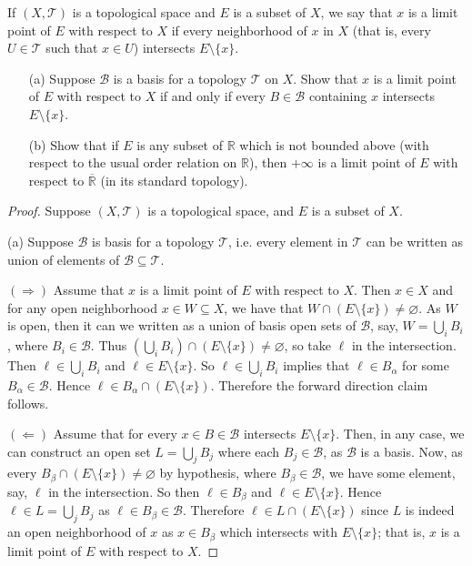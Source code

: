 \documentclass[10pt,reqno]{amsart}
\theoremstyle{definition}
\newcommand{\rr}{\mathbb R}
\begin{document}
\begin{tcolorbox}[colback=black!5!white,colframe=black!75!black,title= Chapter 4: Exercise 1.3.] If $(X, \mathcal T)$ is a topological space and $E$ is a subset of $X$, we say that $x$ is a limit point of $E$ with respect to $X$ if every neighborhood of $x$ in $X$ (that is, every $U \in \mathcal T$ such that $x \in U$) intersects $E \setminus \{ x \}$.
\begin{itemize}
	\item [(a)] Suppose $\mathcal B$ is a basis for a topology $\mathcal T$ on $X$. Show that $x$ is a limit point of $E$ with respect to $X$ if and only if every $B \in \mathcal B$ containing $x$ intersects $E \setminus \{x \}$.
	\item [(b)] Show that if $E$ is any subset of $\rr$ which is not bounded above (with respect to the usual order relation on $\rr$), then $+\infty$ is a limit point of $E$ with respect to $\overline{\rr}$ (in its standard topology).
\end{itemize}
\tcblower
\begin{proof} Suppose $(X, \mathcal T)$ is a topological space, and $E$ is a subset of $X$.

(a) Suppose $\mathcal B$ is basis for a topology $\mathcal T$, i.e. every element in $\mathcal T$ can be written as union of elements of $\mathcal B \subseteq \mathcal T$. 

$(\Rightarrow)$ Assume that $x$ is a limit point of $E$ with respect to $X$. Then $x \in X$ and for any open neighborhood $x \in W \subseteq X$, we have that $W \cap (E \setminus  \{x \} )\neq \varnothing$. As $W$ is open, then it can we written as a union of basis open sets of $\mathcal B$, say, $W = \bigcup_i B_i $, where $B_i \in \mathcal B$. Thus $(\bigcup_i  B_i )\cap (E \setminus \{x \})\neq \varnothing$, so take $\ell$ in the intersection. Then $\ell \in \bigcup_i B_i$ and $\ell \in E \setminus \{ x\}$. So $\ell \in \bigcup _i B_i$ implies that $\ell \in B_\alpha$ for some $B_\alpha \in \mathcal B$. Hence $\ell \in B_\alpha \cap (E\setminus \{x \})$. Therefore the forward direction claim follows.  

$(\Leftarrow)$ Assume that for every $x \in B \in \mathcal B$ intersects $E \setminus \{x \}$. Then, in any case, we can construct an open set $L = \bigcup _j B_j$ where each $B_j \in \mathcal B$, as $\mathcal B$ is a basis. Now, as every $B_\beta \cap (E\setminus \{ x\} ) \neq \varnothing$ by hypothesis, where $B_\beta \in \mathcal B$, we have some element, say, $\ell$ in the intersection. So then $\ell \in B_\beta$ and $\ell \in E \setminus \{x \}$. Hence $\ell \in L = \bigcup _j B_j$ as $\ell \in B_\beta \in \mathcal B$. Therefore $\ell \in L \cap (E\setminus \{ x \})$ since $L$ is indeed an open neighborhood of $x$ as $x \in B_\beta$ which intersects with $E \setminus \{x \}$; that is, $x$ is a limit point of $E$ with respect to $X$. 


\end{proof}
\end{tcolorbox}
\end{document}
